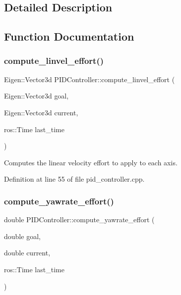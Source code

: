 \subsection{Detailed Description}


\subsection{Function Documentation}
\mbox{\label{group__test__utils_gac62955a265057681e6399488ced3471a}} 
\subsubsection{\texorpdfstring{compute\_linvel\_effort()}{compute\_linvel\_effort()}}
{\footnotesize\ttfamily Eigen\+::\+Vector3d P\+I\+D\+Controller\+::compute\+\_\+linvel\+\_\+effort (\begin{DoxyParamCaption}\item[{Eigen\+::\+Vector3d}]{goal,  }\item[{Eigen\+::\+Vector3d}]{current,  }\item[{ros\+::\+Time}]{last\+\_\+time }\end{DoxyParamCaption})}



Computes the linear velocity effort to apply to each axis. 



Definition at line 55 of file pid\+\_\+controller.\+cpp.

\mbox{\label{group__test__utils_gaee16eb0d9a067ac80a1d92e50991b60b}} 
\subsubsection{\texorpdfstring{compute\_yawrate\_effort()}{compute\_yawrate\_effort()}}
{\footnotesize\ttfamily double P\+I\+D\+Controller\+::compute\+\_\+yawrate\+\_\+effort (\begin{DoxyParamCaption}\item[{double}]{goal,  }\item[{double}]{current,  }\item[{ros\+::\+Time}]{last\+\_\+time }\end{DoxyParamCaption})}



